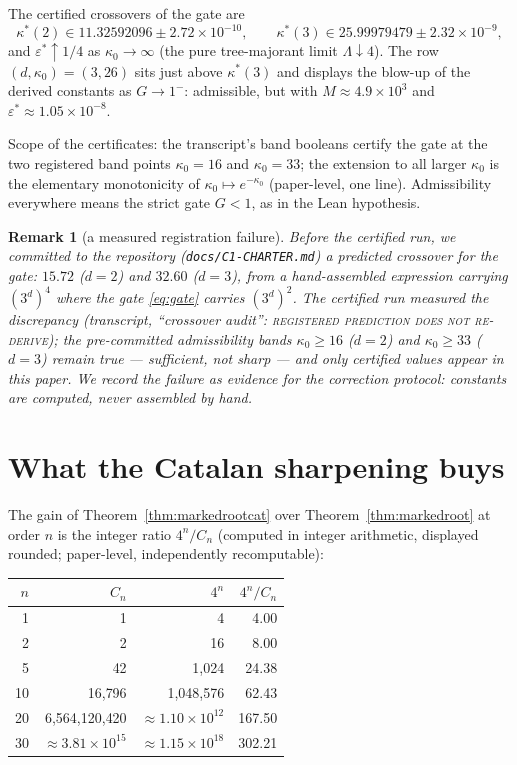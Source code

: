 \documentclass[11pt]{article}
\newtheorem{remark}[theorem]{Remark}
\newcommand{\lean}[1]{\texttt{#1}}
\begin{document}
The certified crossovers of the gate are
\[
\kappa^*(2) \in 11.32592096 \pm 2.72\times 10^{-10}, \qquad
\kappa^*(3) \in 25.99979479 \pm 2.32\times 10^{-9},
\]
and $\varepsilon^* \uparrow 1/4$ as $\kappa_0 \to \infty$ (the pure
tree-majorant limit $\Lambda \downarrow 4$).  The row $(d,\kappa_0) =
(3, 26)$ sits just above $\kappa^*(3)$ and displays the blow-up of
the derived constants as $G \to 1^-$: admissible, but with $M \approx
4.9 \times 10^{3}$ and $\varepsilon^* \approx 1.05 \times 10^{-8}$.

Scope of the certificates: the transcript's band booleans certify the
gate at the two registered band points $\kappa_0 = 16$ and
$\kappa_0 = 33$; the extension to all larger $\kappa_0$ is the
elementary monotonicity of $\kappa_0 \mapsto e^{-\kappa_0}$
(paper-level, one line).  Admissibility everywhere means the strict
gate $G < 1$, as in the Lean hypothesis.

\begin{remark}[a measured registration failure]\label{rem:crossover}
Before the certified run, we committed to the repository
(\lean{docs/C1-CHARTER.md}) a predicted crossover for the gate:
$15.72$ ($d{=}2$) and $32.60$ ($d{=}3$), from a hand-assembled
expression carrying $(3^d)^4$ where the gate \eqref{eq:gate} carries
$(3^d)^2$.  The certified run measured the discrepancy (transcript,
``crossover audit'': \textsc{registered prediction does not
re-derive}); the pre-committed admissibility bands $\kappa_0 \ge 16$
($d{=}2$) and $\kappa_0 \ge 33$ ($d{=}3$) remain true --- sufficient,
not sharp --- and only certified values appear in this paper.  We
record the failure as evidence for the correction protocol: constants
are computed, never assembled by hand.
\end{remark}

\section{What the Catalan sharpening buys}\label{sec:quantitative}

The gain of Theorem~\ref{thm:markedrootcat} over
Theorem~\ref{thm:markedroot} at order $n$ is the integer ratio
$4^n / C_n$ (computed in integer arithmetic, displayed rounded;
paper-level, independently recomputable):

\begin{center}
\begin{tabular}{@{}rrrr@{}}
\toprule
$n$ & $C_n$ & $4^n$ & $4^n/C_n$ \\
\midrule
1  & 1           & 4                & 4.00 \\
2  & 2           & 16               & 8.00 \\
5  & 42          & 1{,}024          & 24.38 \\
10 & 16{,}796    & 1{,}048{,}576    & 62.43 \\
20 & 6{,}564{,}120{,}420 & $\approx 1.10 \times 10^{12}$ & 167.50 \\
30 & $\approx 3.81 \times 10^{15}$ & $\approx 1.15 \times 10^{18}$ & 302.21 \\
\bottomrule
\end{tabular}
\end{center}
\end{document}

